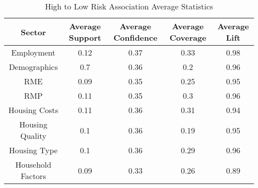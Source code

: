 \begin{table}[h]
    \centering
    \caption{High to Low Risk Association Average Statistics}
    \label{tab:high_low_risk}
    \begin{tabular}{|c|c|c|c|c|}
    \hline
    Sector & Average Support & Average Confidence & Average Coverage & Average Lift \\
    \hline
    Employment & 0.12 & 0.37 & 0.33 & 0.98 \\
    \hline
    Demographics & 0.7 & 0.36 & 0.2 & 0.96 \\
    \hline
    RME & 0.09 & 0.35 & 0.25 & 0.95 \\
    \hline
    RMP & 0.11 & 0.35 & 0.3 & 0.96 \\
    \hline
    Housing Costs & 0.11 & 0.36 & 0.31 & 0.94 \\
    \hline
    Housing Quality & 0.1 & 0.36 & 0.19 & 0.95 \\
    \hline
    Housing Type & 0.1 & 0.36 & 0.29 & 0.96 \\
    \hline
    Household Factors & 0.09 & 0.33 & 0.26 & 0.89 \\
    \hline
    \end{tabular}
    \end{table}
      